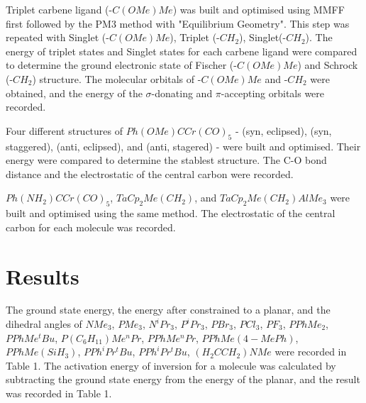\documentclass[twocolumn]{article} %
\begin{document}
Triplet carbene ligand (-$C(OMe)Me$) was built and optimised using MMFF first followed by the PM3 method with "Equilibrium Geometry". This step was repeated with Singlet (-$C(OMe)Me$), Triplet (-$CH_2$), Singlet(-$CH_2$). The energy of triplet states and Singlet states for each carbene ligand were compared to determine the ground electronic state of Fischer (-$C(OMe)Me$) and Schrock (-$CH_2$) structure. The molecular orbitals of -$C(OMe)Me$ and -$CH_2$ were obtained, and the energy of the $\sigma$-donating and $\pi$-accepting orbitals were recorded. 

Four different structures of $Ph(OMe)CCr(CO)_5$ - (syn, eclipsed), (syn, staggered), (anti, eclipsed), and (anti, stagered) - were built and optimised. Their energy were compared to determine the stablest structure. The C-O bond distance and the electrostatic of the central carbon were recorded. 

$Ph(NH_2)CCr(CO)_5$, $TaCp_2Me(CH_2)$, and $TaCp_2Me(CH_2)AlMe_3$ were built and optimised using the same method. The electrostatic of the central carbon for each molecule was recorded. 




\section{Results}

The ground state energy, the energy after constrained to a planar, and the dihedral angles of $NMe_3$, $PMe_3$, $N^iPr_3$, $P^iPr_3$, $PBr_3$, $PCl_3$, $PF_3$, $PPhMe_2$, $PPhMe^tBu$, $P(C_6H_{11})Me^nPr$, $PPhMe^nPr$, $PPhMe(4-MePh)$, $PPhMe(SiH_3)$, $PPh^iPr^tBu$, $PPh^iPr^tBu$, $(H_2CCH_2)NMe$  were recorded in Table 1. The activation energy of inversion for a molecule was calculated by subtracting the ground state energy from the energy of the planar, and the result was recorded in Table 1. 
\end{document}
